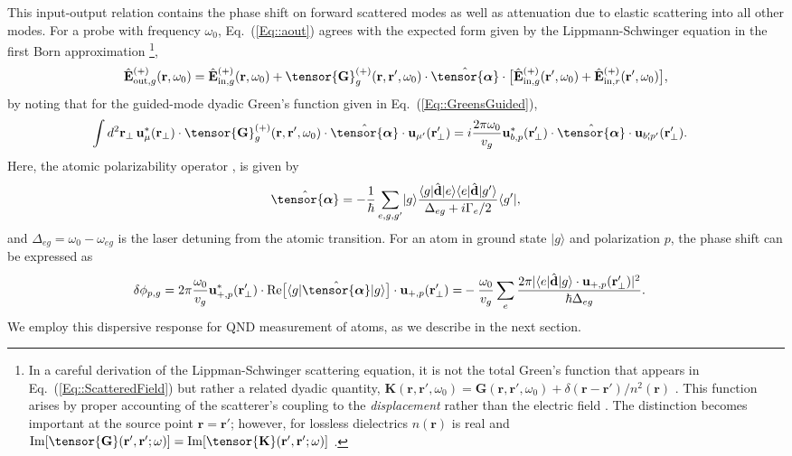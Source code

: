 \documentclass[preprint, aps,pra,onecolumn]{revtex4-1} %
\def\br{\mathbf{r}}
\def\bra#1{\langle{#1}\rvert}%
\def\ket#1{\lvert{#1}\rangle}%
\newcommand{\erf}[1]{Eq.~(\ref{#1})}
\newcommand{\mbf}[1]{\mathbf{#1}}
\newcommand{\inp}{{\rm in}}
\newcommand{\out}{{\rm out}}
\newcommand{\poltens}{\hat{\tensor{\boldsymbol{\alpha}}}}
\begin{document}
This input-output relation contains the phase shift on forward scattered modes as well as attenuation due to elastic scattering into all other modes. For a probe with frequency $\omega_0$, \erf{Eq::aout} agrees with the expected form given by the Lippmann-Schwinger equation in the first Born approximation \footnote{In a careful derivation of the Lippman-Schwinger scattering equation, it is not the total Green's function that appears in \erf{Eq::ScatteredField} but rather a related dyadic quantity, $\mbf{K}(\br,\br', \omega_0) = \mbf{G}(\br,\br', \omega_0) + \delta(\br-\br')/n^2(\br)$ \cite{wubs_multiple-scattering_2004}. 
This function arises by proper accounting of the scatterer's coupling to the \emph{displacement} rather than the electric field \cite{yao_ultrahigh_2009}.  The distinction becomes important at the source point $\mbf{r} = \mbf{r}'$; however, for lossless dielectrics $n(\mathbf{r})$ is real and ${\rm Im}[\tensor{\mathbf{G}}(\br',\br'; \omega)] = {\rm Im}[\tensor{\mathbf{K}}(\br',\br'; \omega)]$ \cite{yao_-chip_2010}. },
	\begin{equation} \label{Eq::IOScatteredField}
		\hat{\mathbf{E}}^{(+)}_{\out,g}(\br, \omega_0)=\hat{\mathbf{E}}^{(+)}_{ \inp, g}(\br, \omega_0)+\tensor{\mathbf{G}}_g^{(+)}(\br,\br', \omega_0)\cdot \poltens \cdot \big[\hat{\mathbf{E}}^{(+)}_{\inp, g}(\br', \omega_0)+\hat{\mathbf{E}}^{(+)}_{\inp,r}(\br', \omega_0) \big],
	\end{equation}
by noting that for the guided-mode dyadic Green's function given in \erf{Eq::GreensGuided},
	\begin{align}
		\int d^2 \mbf{r}_\perp \, \mathbf{u}^*_{\mu} (\br_\perp)\cdot \tensor{\mathbf{G}}_g^{(+)}(\br,\br',\omega_0)\cdot \poltens \cdot \mathbf{u}_{\mu'} (\br'_\perp) &= i \frac{ 2\pi \omega_0}{v_g} \mathbf{u}^*_{b,p} (\br'_\perp) \cdot \poltens \cdot \mathbf{u}_{b'\!\!, p'} (\br'_\perp).  
	\end{align}
Here, the atomic polarizability operator \cite{buhmann_casimir-polder_2004, deutsch_quantum_2010,kien_dynamical_2013}, is given by
	\begin{equation} \label{Eq::PolarizabilityOperator}
		\poltens = - \frac{1}{\hbar} \sum_{e,g,g'}\ket{g}\frac{\bra{g}\hat{\mathbf{d}}\ket{e}\bra{e} 
\hat{\mathbf{d}}\ket{g'}}{\Delta_{eg} + i \Gamma_{e}/2 }\bra{g'},
	\end{equation}	
and $\Delta_{eg} = \omega_0 - \omega_{eg}$ is the laser detuning from the atomic transition.	
For an atom in ground state $\ket{g}$ and polarization $p$, the phase shift can be expressed as \cite{le_kien_propagation_2014}
	\begin{align} \label{Eq::PhaseShiftMultilevel}
		\delta  \phi_{p,g} =2\pi \frac{ \omega_{0} }{v_g} \mathbf{u}^*_{+, p}(\br'_\perp) \cdot {\rm Re}\big[\bra{g} \hat{\tensor{\boldsymbol{\alpha}}} \ket{g} \big] \cdot \mathbf{u}_{+, p}(\br'_\perp) =& -\frac{ \omega_{0} }{v_g} \sum_e \frac{2 \pi |\bra{e}\hat{\mathbf{d}}\ket{g} \cdot \mathbf{u}_{+,p}(\br'_\perp)|^2}{ \hbar  \Delta_{eg} } .
	\end{align}  
We employ this dispersive response for QND measurement of atoms, as we describe in the next section.
\end{document}
